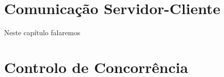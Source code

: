 \chapter{Comunicação Servidor-Cliente}
Neste capítulo falaremos 



\chapter{Controlo de Concorrência}

